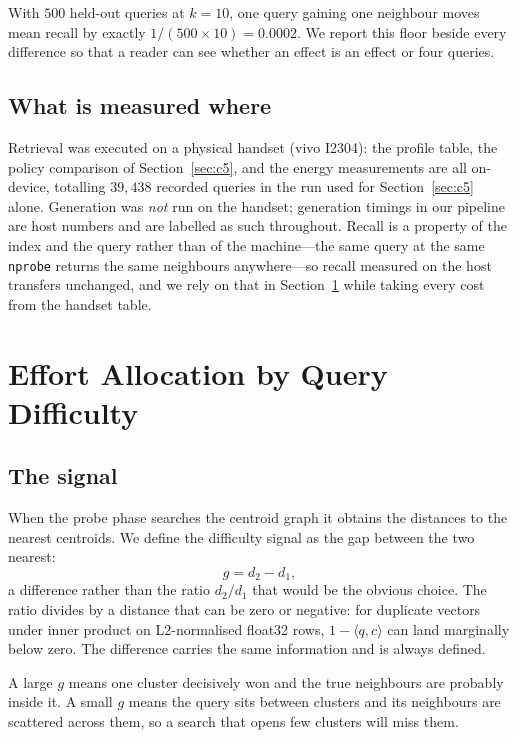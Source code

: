 \documentclass[conference]{IEEEtran}
\begin{document}
With $500$ held-out queries at $k=10$, one query gaining one neighbour moves
mean recall by exactly $1/(500 \times 10) = 0.0002$. We report this floor beside
every difference so that a reader can see whether an effect is an effect or four
queries.

\subsection{What is measured where}

Retrieval was executed on a physical handset (vivo I2304): the profile table,
the policy comparison of Section~\ref{sec:c5}, and the energy measurements are
all on-device, totalling $39{,}438$ recorded queries in the run used for
Section~\ref{sec:c5} alone. Generation was \emph{not} run on the handset;
generation timings in our pipeline are host numbers and are labelled as such
throughout. Recall is a property of the index and the query rather than of the
machine---the same query at the same \texttt{nprobe} returns the same
neighbours anywhere---so recall measured on the host transfers unchanged, and
we rely on that in Section~\ref{sec:c6} while taking every cost from the
handset table.

\section{Effort Allocation by Query Difficulty}
\label{sec:c6}

\subsection{The signal}

When the probe phase searches the centroid graph it obtains the distances to
the nearest centroids. We define the difficulty signal as the gap between the
two nearest:
\begin{equation}
g = d_2 - d_1 ,
\end{equation}
a difference rather than the ratio $d_2/d_1$ that would be the obvious choice.
The ratio divides by a distance that can be zero or negative: for duplicate
vectors under inner product on L2-normalised float32 rows, $1 - \langle q,c
\rangle$ can land marginally below zero. The difference carries the same
information and is always defined.

A large $g$ means one cluster decisively won and the true neighbours are
probably inside it. A small $g$ means the query sits between clusters and its
neighbours are scattered across them, so a search that opens few clusters will
miss them.
\end{document}
